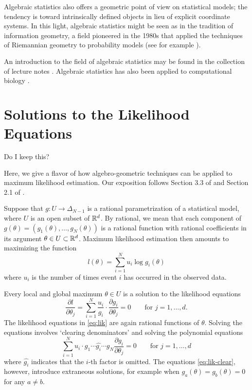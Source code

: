 \documentclass[cclicense]{hmcthesis}
\numberwithin{equation}{chapter}
\numberwithin{thmcounter}{chapter}
\begin{document}
    Algebraic statistics also offers a geometric point of view on statistical
    models; the tendency is toward intrinsically defined objects in lieu of
    explicit coordinate systems.  In this light, algebraic statistics might be
    seen as in the tradition of information geometry, a field pioneered in the
    1980s that applied the techniques of Riemannian geometry to probability
    models (see for example \citep{Ama}).

    An introduction to the field of algebraic statistics may be found in the
    collection of lecture notes \citep{DSS08}.  Algebraic statistics has also
    been applied to computational biology \citep{ASCB}.

\section{Solutions to the Likelihood Equations}

    Do I keep this?

    Here, we give a flavor of how algebro-geometric techniques can be applied to
    maximum likelihood estimation.  Our exposition follows Section 3.3 of
    \citep{ASCB} and Section 2.1 of \citep{DSS08}.

    Suppose that $g: U \to \Delta_{N-1}$ is a rational parametrization of a
    statistical model, where $U$ is an open subset of $\mathbb{R}^d$.  By rational, we
    mean that each component of $g(\theta) = (g_1(\theta), \ldots, g_N(\theta))$
    is a rational function with rational coefficients in its argument $\theta
    \in U \subset \mathbb{R}^d$.  Maximum likelihood estimation then amounts to
    maximizing the function
    \[
        l(\theta) = \sum_{i=1}^N u_i \log g_i(\theta)
    \] 
    where $u_i$ is the number of times event $i$ has occurred in the observed
    data.

    Every local and global maximum $\theta \in U$ is a solution to the
    likelihood equations
    \begin{equation}\label{eq:lik}
        \frac{\partial l}{\partial\theta_j}
        =
        \sum_{i=1}^N 
        \frac{u_i}{g_i} 
        \cdot
        \frac{\partial g_i}{\partial \theta_j}
        = 0
        \qquad
        \text{for $j = 1,\ldots,d$}.
    \end{equation}
    The likelihood equations in \eqref{eq:lik} are again rational functions of
    $\theta$.  Solving the equations involves `clearing denominators' and
    solving the polynomial equations
    \begin{equation}\label{eq:lik-clear}
        \sum_{i=1}^N 
        u_i \cdot g_1 \cdots \widehat{g_i} \cdots g_N
        \frac{\partial g_i}{\partial \theta_j}
        = 0
        \qquad
        \text{for $j = 1, \ldots, d$}
    \end{equation}
    where $\widehat{g_i}$ indicates that the $i$-th factor is omitted.  The
    equations \eqref{eq:lik-clear}, however, introduce extraneous solutions, for
    example when $g_a(\theta) = g_b(\theta) = 0$ for any $a \ne b$.
\end{document}
